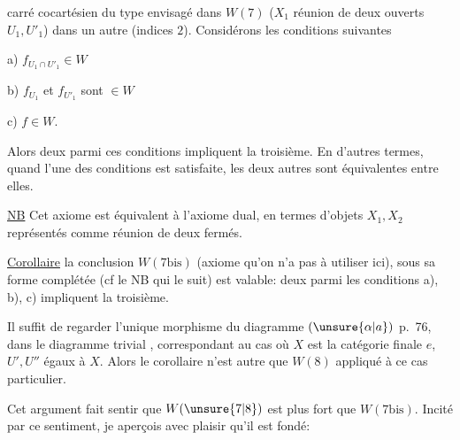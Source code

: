 carré cocartésien
du type envisagé dans $W(7)$ ($X_1$ réunion de deux ouverts $U_1,U'_1$) dans un
autre (indices $2$). Considérons les conditions suivantes

a) $f_{U_1\cap U'_1}\in W$

b) $f_{U_1}$ et $f_{U'_1}$ sont $\in W$

c) $f\in W$.

Alors deux parmi ces conditions impliquent la troisième.
En d'autres termes, quand l'une des  conditions est satisfaite, les deux autres sont équivalentes
entre elles.

\uline{NB} Cet axiome est équivalent à l'axiome dual,
 en termes d'objets $X_1,X_2$ représentés  comme
réunion de deux fermés.

\uline{Corollaire}   la conclusion  $W(7\mathrm{bis})$ (axiome
qu'on n'a pas à utiliser ici), sous sa forme complétée
(cf le NB qui le suit) est valable: deux parmi les
conditions a), b), c) impliquent la troisième.

Il suffit de regarder l'unique morphisme
du diagramme $(\unsure{\alpha|a})$ p.~76, dans le diagramme
trivial
, correspondant au cas où
$X$ est la catégorie finale $e$,  $U',U''$ égaux à $X$. Alors le
corollaire n'est autre que $W(8)$ appliqué à ce
cas particulier.

Cet argument fait sentir que $W(\unsure{7|8})$ est  plus
fort que $W(7\mathrm{bis})$. Incité par ce sentiment, je 
aperçois avec plaisir qu'il est fondé:
